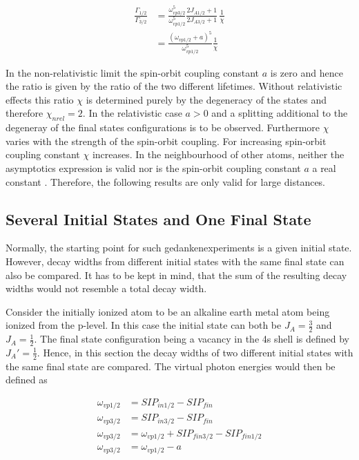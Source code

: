 \begin{align}
  \frac{\Gamma_{1/2}}{\Gamma_{3/2}}
  &= \frac{\omega_{vp3/2}^5}{\omega_{vp1/2}^5} \frac{2J_{A1/2}+1}{2J_{A3/2}+1} \,
     \frac{1}{\chi}\\
  &= \frac{(\omega_{vp1/2} +a)^5}{\omega_{vp1/2}^5} \frac{1}{\chi}
     \label{equation:gamma_ratio_arxetype}
\end{align}

In the non-relativistic limit the spin-orbit coupling constant $a$ is zero and
hence the ratio is given by the ratio of the two different lifetimes. Without
relativistic effects this ratio $\chi$ is determined purely by the degeneracy
of the states and therefore $\chi_{nrel} = 2$.
In the relativistic case $a>0$ and a splitting additional to the degeneray of
the final states configurations is to be observed. Furthermore $\chi$ varies
with the strength of the spin-orbit coupling. For increasing spin-orbit coupling
constant $\chi$ increases.
In the neighbourhood of other atoms, neither the asymptotics expression is valid
nor is the spin-orbit coupling constant $a$
a real constant \cite{Freudenberg_Forsch}. Therefore, the following
results are only valid for large distances.




\subsection{Several Initial States and One Final State}
Normally, the starting point for such gedankenexperiments is a given initial
state. However, decay widths from different initial states with the same
final state can also be compared. It has to be kept in mind, that
the sum of the resulting decay widths would not resemble a total decay width.

Consider the initially ionized atom to be an alkaline earth metal atom
being ionized from the
p-level. In this case the initial state can both be $J_A = \frac 32$ and
$J_A = \frac12$. The final state configuration being a vacancy in the
4s shell is defined by $J_A'= \frac 12$. Hence, in this section the decay
widths of two different initial states with the same final state are compared.
The virtual photon energies would then be defined as

\begin{align}
  \omega_{vp1/2} &= SIP_{in1/2} - SIP_{fin}  \\
  \omega_{vp3/2} &= SIP_{in3/2} - SIP_{fin}  \\
  \omega_{vp3/2} &= \omega_{vp1/2} + SIP_{fin3/2} - SIP_{fin1/2} \\
  \omega_{vp3/2} &= \omega_{vp1/2} - a 
\end{align}

